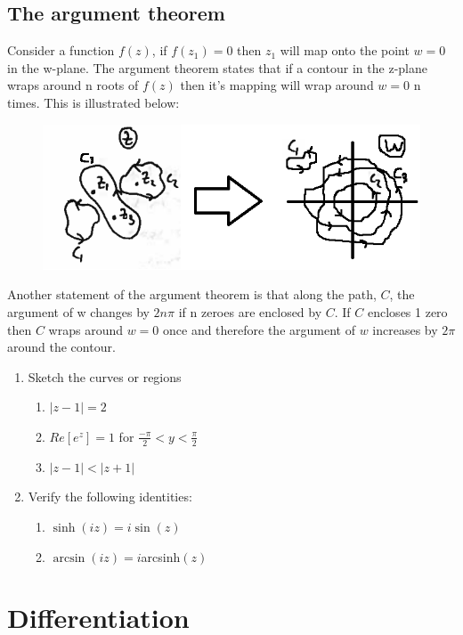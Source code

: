 \subsection{The argument theorem}
Consider a function $f(z)$, if $f(z_1)=0$ then $z_1$ will map onto the point $w=0$ in the w-plane.
 The argument theorem states that if a contour in the z-plane wraps around n roots of $f(z)$ then it's mapping will wrap around $w=0$ n times. 
 This is illustrated below:
\begin{figure}[H]
	\centering
	\includegraphics[width=\linewidth]{complex/argthm}
	\captionsetup{font=small} 	
\end{figure}
\noindent Another statement of the argument theorem is that along the path, $C$, the argument of w changes by $2n\pi$ if n zeroes are enclosed by $C$. 
If $C$ encloses 1 zero then $C$ wraps around $w=0$ once and therefore the argument of $w$ increases by $2\pi$ around the contour.
\newpage
\begin{examples}
	\begin{enumerate}
		\item Sketch the curves or regions
		\begin{enumerate}
			\item $|z-1|=2$
			\item $Re[e^z]=1$ for $\frac{-\pi}{2} < y < \frac{\pi}{2}$
			\item $|z-1|<|z+1|$
		\end{enumerate}
		\item Verify the following identities:
		\begin{enumerate}
			\item $\sinh(iz)=i\sin(z)$
			\item $\arcsin(iz)=i$arcsinh$(z)$
		\end{enumerate}
	\end{enumerate}
\end{examples}
\section{Differentiation}
